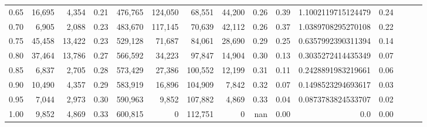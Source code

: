\begin{tabular}{rrrrrrrrrrrrrrr}
0.65 &  16,695 &   4,354 &  0.21 &  476,765 &  124,050 &   68,551 &   44,200 &  0.26 &  0.39 &  1.1002119715124479 &      0.24 \\
0.70 &   6,905 &   2,088 &  0.23 &  483,670 &  117,145 &   70,639 &   42,112 &  0.26 &  0.37 &  1.0389708295270108 &      0.22 \\
0.75 &  45,458 &  13,422 &  0.23 &  529,128 &   71,687 &   84,061 &   28,690 &  0.29 &  0.25 &  0.6357992390311394 &      0.14 \\
0.80 &  37,464 &  13,786 &  0.27 &  566,592 &   34,223 &   97,847 &   14,904 &  0.30 &  0.13 &  0.3035272414435349 &      0.07 \\
0.85 &   6,837 &   2,705 &  0.28 &  573,429 &   27,386 &  100,552 &   12,199 &  0.31 &  0.11 &  0.2428891983219661 &      0.06 \\
0.90 &  10,490 &   4,357 &  0.29 &  583,919 &   16,896 &  104,909 &    7,842 &  0.32 &  0.07 &  0.1498523294693617 &      0.03 \\
0.95 &   7,044 &   2,973 &  0.30 &  590,963 &    9,852 &  107,882 &    4,869 &  0.33 &  0.04 &  0.0873783824533707 &      0.02 \\
1.00 &   9,852 &   4,869 &  0.33 &  600,815 &        0 &  112,751 &        0 &   nan &  0.00 &                 0.0 &      0.00 \\
\bottomrule
\end{tabular}
